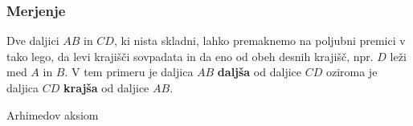 \begin{frame}
\begin{block}{}
\begin{figure}[H]
                \end{figure}
            \end{block}
        \end{frame}

        \begin{frame}
            \frametitle{Merjenje}

            \begin{block}{}
                Dve daljici $AB$ in $CD$, ki nista skladni, lahko premaknemo na poljubni premici v tako lego,
                da levi krajišči sovpadata in da eno od obeh desnih krajišč, npr. $D$ leži med $A$ in $B$.
                V tem primeru je daljica $AB$ \textbf{daljša} od daljice $CD$ oziroma je daljica $CD$ \textbf{krajša} od daljice $AB$.
            \end{block}

            \begin{alertblock}{Arhimedov aksiom}
                
            \end{alertblock}
        \end{frame}


